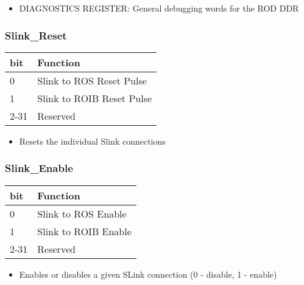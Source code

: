 \begin{itemize}
\item DIAGNOSTICS REGISTER: General debugging words for the ROD DDR
\end{itemize}




\subsubsection{Slink\_Reset}

\begin {table}[H]
\begin{center}
\begin{tabular}{|l|l|}
\hline
\textbf{bit} & \textbf{Function} \\
\hline
0 & Slink to ROS Reset Pulse \\
\hline
1 & Slink to ROIB Reset Pulse \\
\hline
2-31 & Reserved \\
\hline
\end{tabular}
\end{center}
\end{table}


\begin{itemize}
\item Resets the individual Slink connections
\end{itemize}



\subsubsection{Slink\_Enable}

\begin {table}[H]
\begin{center}
\begin{tabular}{|l|l|}
\hline
\textbf{bit} & \textbf{Function} \\
\hline
0 & Slink to ROS Enable \\
\hline
1 & Slink to ROIB Enable \\
\hline
2-31 & Reserved \\
\hline
\end{tabular}
\end{center}
\end{table}


\begin{itemize}
\item Enables or disables a given SLink connection (0 - disable, 1 - enable)
\end{itemize}



